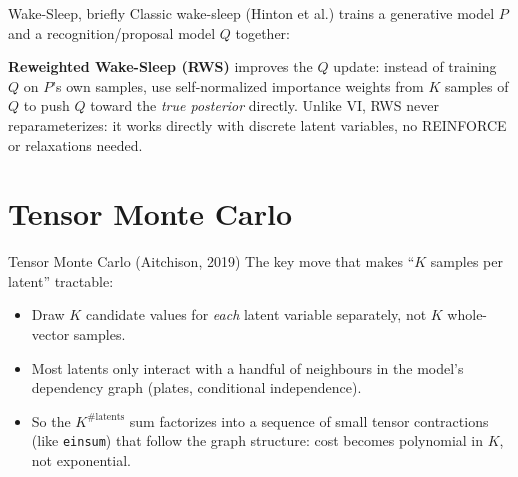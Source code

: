 \documentclass[aspectratio=169]{beamer}
\begin{document}
\begin{frame}{Wake-Sleep, briefly}
  Classic wake-sleep (Hinton et al.) trains a generative model $P$ and a
  recognition/proposal model $Q$ together:
  \begin{center}
  \end{center}
  \small\textbf{Reweighted Wake-Sleep (RWS)} improves the $Q$ update: instead
  of training $Q$ on $P$'s own samples, use self-normalized importance
  weights from $K$ samples of $Q$ to push $Q$ toward the \emph{true
  posterior} directly. Unlike VI, RWS never reparameterizes: it works
  directly with \alert{discrete latent variables}, no REINFORCE or
  relaxations needed.
\end{frame}

\section{Tensor Monte Carlo}

\begin{frame}{Tensor Monte Carlo (Aitchison, 2019)}
  The key move that makes ``$K$ samples per latent'' tractable:
  \begin{itemize}
    \item Draw $K$ candidate values for \emph{each} latent variable
      separately, not $K$ whole-vector samples.
    \item Most latents only interact with a handful of neighbours in the
      model's dependency graph (plates, conditional independence).
    \item So the $K^{\#\text{latents}}$ sum factorizes into a sequence of
      small tensor contractions (like \texttt{einsum}) that follow the
      graph structure: cost becomes polynomial in $K$, not exponential.
  \end{itemize}
\end{frame}
\end{document}

